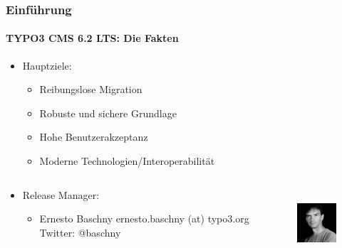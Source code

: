 \begin{frame}[fragile]
	\frametitle{Einführung}
	\framesubtitle{TYPO3 CMS 6.2 LTS: Die Fakten}

	\begin{itemize}
		\item Hauptziele:

			\begin{itemize}
				\item Reibungslose Migration
				\item Robuste und sichere Grundlage
				\item Hohe Benutzerakzeptanz
				\item Moderne Technologien/Interoperabilität
			\end{itemize}

	\end{itemize}

	\begin{columns}[T]

		\begin{column}{.5\textwidth}
			\begin{itemize}
				\item Release Manager:
				\begin{itemize}
					\item Ernesto Baschny\newline
						ernesto.baschny (at) typo3.org\newline
						Twitter: @baschny
				\end{itemize}
			\end{itemize}
		\end{column}

		\begin{column}{.5\textwidth}
			\begin{figure}
				\includegraphics[width=2.6cm,height=2.6cm]{Images/Introduction/ErnestoBaschny.jpg}
			\end{figure}
		\end{column}

	\end{columns}

\end{frame}


